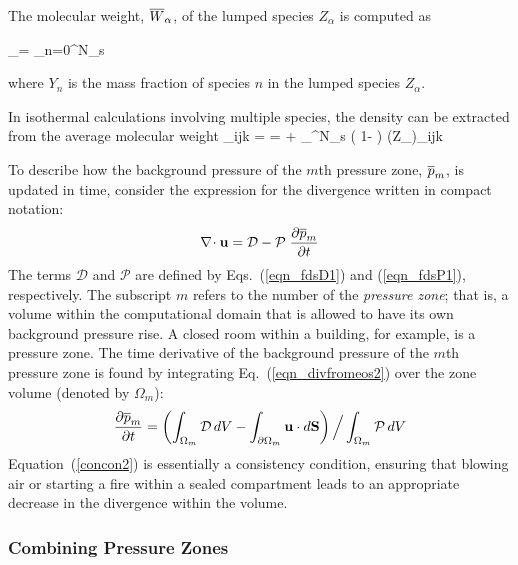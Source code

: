 The molecular weight, $\overline{W}_\alpha$, of the lumped species $Z_\alpha$ is computed as

\be \bW_\alpha =  \sum_{n=0}^{N_s}  \ee

where $Y_n$ is the mass fraction of species $n$ in the lumped species $Z_\alpha$.

In isothermal calculations involving multiple species, the density
can be extracted from the average molecular weight
\be \rho_{ijk} =   =
    + \sum_{}^{N_s} \left( 1- \right)
   (\rho Z_\alpha)_{ijk} \ee


To describe how the background pressure of the $m$th pressure zone, $\overline{p}_m$, is updated in time, consider the expression for the
divergence written in compact notation:
\begin{equation}
\label{eqn_divfromeos2}
\nabla\!\cdot {\bf u} = {\cal D} - {\cal P}\; \frac{\partial \overline{p}_m}{\partial t}
\end{equation}
The terms $\mathcal{D}$ and $\mathcal{P}$ are defined by Eqs.~(\ref{eqn_fdsD1}) and (\ref{eqn_fdsP1}), respectively. The subscript $m$ refers to the
number of the {\em pressure zone}; that is, a volume within the computational domain that is allowed to have its own background pressure rise. A closed room
within a building, for example, is a pressure zone.
The time derivative of the background pressure of the $m$th
pressure zone is found by integrating Eq.~(\ref{eqn_divfromeos2}) over the zone volume (denoted by $\Omega_m$):
\begin{equation}
\frac{\partial \overline{p}_m}{\partial t} = \left( \int_{\Omega_m} {\cal D} \, dV - \int_{\partial \Omega_m} {\bf u} \cdot d{\bf S} \right) \Big/ \int_{\Omega_m} {\cal P} \, dV  \label{concon2}
\end{equation}
Equation~(\ref{concon2}) is essentially a consistency condition, ensuring that blowing air or starting a fire within a sealed
compartment leads to an appropriate decrease in the divergence within the volume.


\subsubsection{Combining Pressure Zones}

